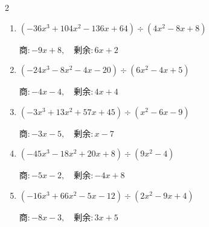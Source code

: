 \begin{multicols}{2}
\begin{enumerate}
        $商 : x+8, \quad 剰余 : -4x-9$

\columnbreak %

  \item $(-36x^{3}+104x^{2}-136x+64) \div (4x^{2}-8x+8)$

        $商 : -9x+8, \quad 剰余 : 6x+2$

  \item $(-24x^{3}-8x^{2}-4x-20) \div (6x^{2}-4x+5)$

        $商 : -4x-4, \quad 剰余 : 4x+4$

  \item $(-3x^{3}+13x^{2}+57x+45) \div (x^{2}-6x-9)$

        $商 : -3x-5, \quad 剰余 : x-7$

  \item $(-45x^{3}-18x^{2}+20x+8) \div (9x^{2}-4)$

        $商 : -5x-2, \quad 剰余 : -4x+8$

  \item $(-16x^{3}+66x^{2}-5x-12) \div (2x^{2}-9x+4)$

        $商 : -8x-3, \quad 剰余 : 3x+5$

\end{enumerate}
\end{multicols}
